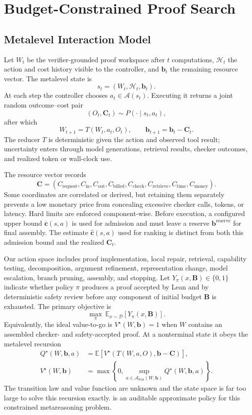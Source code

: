 \section{Budget-Constrained Proof Search}

\subsection{Metalevel Interaction Model}

Let \(W_t\) be the verifier-grounded proof workspace after \(t\)
computations, \(\mathcal H_t\) the action and cost history visible to the
controller, and \(\mathbf b_t\) the remaining resource vector. The metalevel
state is
\[
    s_t=(W_t,\mathcal H_t,\mathbf b_t).
\]
At each step the controller chooses \(a_t\in\mathcal A(s_t)\). Executing it
returns a joint random outcome--cost pair
\[
    (O_t,\mathbf C_t)\sim P(\cdot\mid s_t,a_t),
\]
after which
\[
    W_{t+1}=T(W_t,a_t,O_t),
    \qquad
    \mathbf b_{t+1}=\mathbf b_t-\mathbf C_t.
\]
The reducer \(T\) is deterministic given the action and observed tool result;
uncertainty enters through model generations, retrieval results, checker
outcomes, and realized token or wall-clock use.

The resource vector records
\[
  \mathbf C =
  (C_{\mathrm{request}},C_{\mathrm{in}},C_{\mathrm{out}},
   C_{\mathrm{billed}},C_{\mathrm{check}},C_{\mathrm{retrieve}},
   C_{\mathrm{time}},C_{\mathrm{money}}).
\]
Some coordinates are correlated or derived, but retaining them separately
prevents a low monetary price from concealing excessive checker calls, tokens,
or latency. Hard limits are enforced component-wise. Before execution, a
configured upper bound \(\overline{\mathbf c}(s,a)\) is used for admission and
must leave a reserve \(\mathbf b^{\mathrm{reserve}}\) for final assembly. The
estimate \(\hat{\mathbf c}(s,a)\) used for ranking is distinct from both this
admission bound and the realized \(\mathbf C_t\).

Our action space includes proof implementation, local repair, retrieval,
capability testing, decomposition, argument refinement, representation change,
model escalation, branch pruning, assembly, and stopping. Let
\(Y_\pi(x,\mathbf B)\in\{0,1\}\) indicate whether policy \(\pi\) produces a
proof accepted by Lean and by deterministic safety review before any component
of initial budget \(\mathbf B\) is exhausted. The primary objective is
\[
  \max_\pi\ \mathbb E_{x\sim\mathcal D}
  [Y_\pi(x,\mathbf B)].
\]
Equivalently, the ideal value-to-go is \(V^\star(W,\mathbf b)=1\) when
\(W\) contains an assembled checker- and safety-accepted proof. At a
nonterminal state it obeys the metalevel recursion
\[
\begin{aligned}
Q^\star(W,\mathbf b,a)
  &=\mathbb E\!\left[
      V^\star\!\left(T(W,a,O),\mathbf b-\mathbf C\right)\right],\\
V^\star(W,\mathbf b)
  &=\max\!\left\{0,
      \sup_{a\in\mathcal A_{\mathrm{feas}}(W,\mathbf b)}
      Q^\star(W,\mathbf b,a)\right\}.
\end{aligned}
\]
The transition law and value function are unknown and the state space is far
too large to solve this recursion exactly. \system{} is an auditable approximate
policy for this constrained metareasoning problem.

